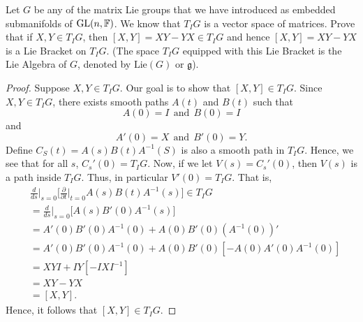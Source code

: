 \documentclass[a4paper]{article}
\begin{document}
\begin{problem}
    Let \( G  \) be any of the matrix Lie groups that we have introduced as embedded submanifolds of \( \text{GL}(n,\mathbb{F})  \). We know that \( {T}_{I}G \) is a vector space of matrices. Prove that if \( X,Y \in {T}_{I}G \), then \( [X,Y] = XY - Y X  \in {T}_{I}G \) and hence \( [X,Y] = XY- Y X \) is a Lie Bracket on \( {T}_{I}G \). (The space \( {T}_{I}G \) equipped with this Lie Bracket is the Lie Algebra of \( G  \), denoted by \( \text{Lie}(G)  \) or \( \mathfrak{g} \)).
\end{problem}
\begin{proof}
    Suppose \( X,Y \in {T}_{I}G \). Our goal is to show that \( [X,Y] \in {T}_{I}G \). Since \( X,Y \in {T}_{I}G \), there exists smooth paths \( A(t)  \) and \( B(t) \) such that  
    \[ A(0) = I  \ \ \text{and} \ \ B(0) = I  \]
    and
    \[  A'(0) = X  \ \ \text{and} \ \ B'(0) = Y.  \]
    Define \( {C}_{S}(t) = A(s) B(t) A^{-1}(S) \) is also a smooth path in \( {T}_{I}G \). Hence, we see that for all \( s  \), \( {C}_{s}'(0) = {T}_{I}G \). Now, if we let \( V(s) = {C}_{s}'(0)   \), then \( V(s)   \) is a path inside \( {T}_{I}G \). Thus, in particular \( V'(0) = {T}_{I}G \). That is, 
    \begin{align*}
    &\frac{ d }{ ds }  \Big|_{s = 0} \Big[ \frac{ \partial  }{  \partial t  }  \Big|_{t = 0} A(s) B(t) A^{-1}(s) \Big] \in {T}_{I}G   \\
    &= \frac{ d }{ ds }  \Big|_{s = 0 } \Big[ A(s) B'(0) A^{-1}(s) \Big] \\
    &= A'(0) B'(0) A^{-1}(0) + A(0) B'(0) (A^{-1}(0))' \\
    &= A'(0) B'(0) A^{-1}(0) + A(0) B'(0) [-A(0) A'(0) A^{-1}(0)] \\
    &= XY I + I Y [-I X I^{-1}] \\
    &= XY - YX \\
    &= [X,Y].
    \end{align*}
    Hence, it follows that \( [X,Y] \in {T}_{I}G \).
\end{proof}
\end{document}

